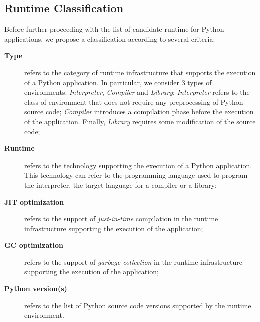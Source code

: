 \subsection{Runtime Classification}
Before further proceeding with the list of candidate runtime for Python applications, we propose a classification according to several criteria:
\begin{description}
      \item[\bf Type] refers to the category of runtime infrastructure that supports the execution of a Python application.
            In particular, we consider 3 types of environments: \emph{Interpreter}, \emph{Compiler} and \emph{Library};
            \emph{Interpreter} refers to the class of environment that does not require any preprocessing of Python source code;
            \emph{Compiler} introduces a compilation phase before the execution of the application.
            Finally, \emph{Library} requires some modification of the source code;
      \item[\bf Runtime] refers to the technology supporting the execution of a Python application.
            This technology can refer to the programming language used to program the interpreter, the target language for a compiler or a library;
      \item[\bf JIT optimization] refers to the support of \emph{just-in-time} compilation in the runtime infrastructure supporting the execution of the application;
      \item[\bf GC optimization] refers to the support of \emph{garbage collection} in the runtime infrastructure supporting the execution of the application;
      \item[\bf Python version(s)] refers to the list of Python source code versions supported by the runtime environment.
\end{description}

